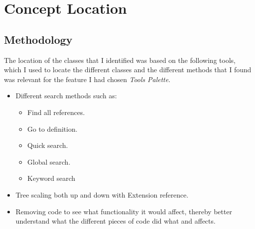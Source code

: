 \section{Concept Location}

\subsection{Methodology}
The location of the classes that I identified was based on the following tools, which I used to locate the different classes and the different methods
that I found was relevant for the feature I had chosen \textit{Tools Palette}.
\begin{itemize}
    \item Different search methods such as:
          \begin{itemize}
              \item Find all references.
              \item Go to definition.
              \item Quick search.
              \item Global search.
              \item Keyword search
          \end{itemize}
    \item Tree scaling both up and down with Extension reference.
    \item Removing code to see what functionality it would affect, thereby better understand what the different pieces of code did what and affects.
\end{itemize}
